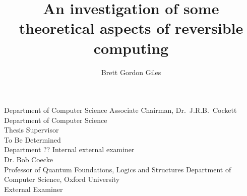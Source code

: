 \documentclass{ucalgthes1}
\title{An investigation of some theoretical aspects of reversible computing \\
\bigskip  }
\author{Brett Gordon Giles}
\newcommand{\thesistitle}{An investigation of the theoretical aspects of reversible computing}
\begin{document}
\makethesistitle
{}     %
\setcounter{page}{1}

%
%
\begin{signing}{Department of Computer Science}
\signline
Associate Chairman, Dr.~J.R.B.~Cockett\\
Department of Computer Science \\
Thesis Supervisor\\
\signline
To Be Determined \\
Department ??
Internal external examiner  \\

\signline
Dr. Bob Coecke\\
Professor of Quantum Foundations, Logics and Structures
Department of Computer Science,  Oxford University \\
External Examiner
\end{signing}
%
\newpage
{}
{}

\newpage
{}
{}
\end{document}
